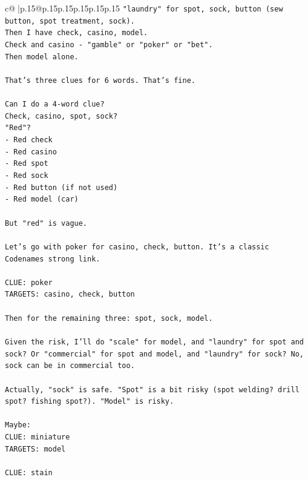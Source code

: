 \documentclass{article}
\begin{document}
{\begin{supertabular}{c@{$\;$}|p{.15\linewidth}@{}p{.15\linewidth}p{.15\linewidth}p{.15\linewidth}p{.15\linewidth}p{.15\linewidth}}
{{{\texttt{"laundry" for spot, sock, button (sew button, spot treatment, sock).} \\
\texttt{Then I have check, casino, model.} \\
\texttt{Check and casino {-} "gamble" or "poker" or "bet".} \\
\texttt{Then model alone.} \\
\\ 
\texttt{That's three clues for 6 words. That's fine.} \\
\\ 
\texttt{Can I do a 4{-}word clue?} \\
\texttt{Check, casino, spot, sock?} \\
\texttt{"Red"?} \\
\texttt{{-} Red check} \\
\texttt{{-} Red casino} \\
\texttt{{-} Red spot} \\
\texttt{{-} Red sock} \\
\texttt{{-} Red button (if not used)} \\
\texttt{{-} Red model (car)} \\
\\ 
\texttt{But "red" is vague.} \\
\\ 
\texttt{Let's go with poker for casino, check, button. It's a classic Codenames strong link.} \\
\\ 
\texttt{CLUE: poker} \\
\texttt{TARGETS: casino, check, button} \\
\\ 
\texttt{Then for the remaining three: spot, sock, model.} \\
\\ 
\texttt{Given the risk, I'll do "scale" for model, and "laundry" for spot and sock? Or "commercial" for spot and model, and "laundry" for sock? No, sock can be in commercial too.} \\
\\ 
\texttt{Actually, "sock" is safe. "Spot" is a bit risky (spot welding? drill spot? fishing spot?). "Model" is risky.} \\
\\ 
\texttt{Maybe:} \\
\texttt{CLUE: miniature} \\
\texttt{TARGETS: model} \\
\\ 
\texttt{CLUE: stain} \\
}}}
\end{supertabular}}
\end{document}
